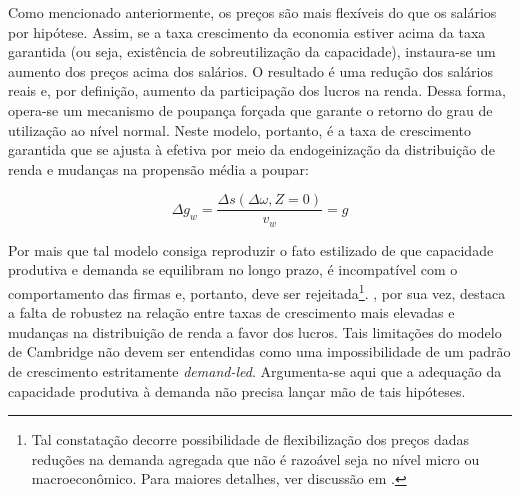 Como mencionado anteriormente, os preços são mais flexíveis do que os salários por hipótese. Assim, se a taxa crescimento da economia estiver acima da taxa garantida (ou seja, existência de sobreutilização da capacidade), instaura-se um aumento dos preços acima dos salários. O resultado é uma redução dos salários reais e, por definição, aumento da participação dos lucros na renda. Dessa forma, opera-se um mecanismo de poupança forçada que garante o retorno do grau de utilização ao nível normal. Neste modelo, portanto, é a taxa de crescimento garantida que se ajusta à efetiva por meio da endogeinização da distribuição de renda e mudanças na propensão média a poupar:

$$
\Delta g_w = \frac{\Delta s(\Delta \omega, Z = 0)}{v_w} = g
$$

Por mais que tal modelo consiga reproduzir o fato estilizado de que capacidade produtiva e demanda se equilibram no longo prazo, é incompatível com o comportamento das firmas e, portanto, deve ser rejeitada\footnote{Tal constatação decorre possibilidade de flexibilização dos preços dadas reduções na demanda agregada que não é razoável seja no nível micro ou macroeconômico. Para maiores detalhes, ver discussão em \textcites[p.~104--5, n. 17]{serrano_teoria_1988}[Original de 1986]{ciccone_2017}.}. \textcite[p.~158]{cesaratto_neo-kaleckian_2015}, por sua vez, destaca a falta de robustez na relação entre taxas de crescimento mais elevadas e mudanças na distribuição de renda a favor dos lucros.
Tais limitações do modelo de Cambridge não devem ser entendidas como uma impossibilidade de um padrão de crescimento estritamente \textit{demand-led}. Argumenta-se aqui que a adequação da capacidade produtiva à demanda não precisa lançar mão de tais hipóteses. 

